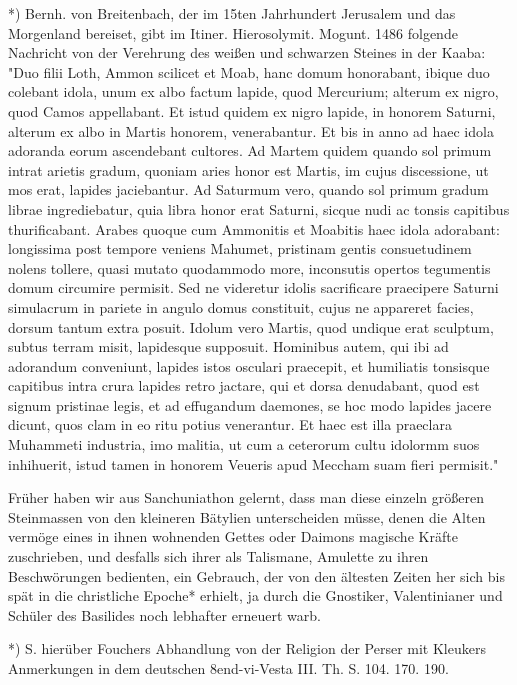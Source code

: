 \documentclass[a4paper, 11pt, oneside, polutonikogreek, german]{article}
\begin{document}
*) Bernh. von Breitenbach, der im 15ten Jahrhundert Jerusalem und das Morgenland bereiset, gibt im Itiner. Hierosolymit. Mogunt. 1486 folgende Nachricht von der Verehrung des weißen und schwarzen Steines in der Kaaba: "Duo filii Loth, Ammon scilicet et Moab, hanc domum honorabant, ibique duo colebant idola, unum ex albo factum lapide, quod Mercurium; alterum ex nigro, quod Camos appellabant. Et istud quidem ex nigro lapide, in honorem Saturni, alterum ex albo in Martis honorem, venerabantur. Et bis in anno ad haec idola adoranda eorum ascendebant cultores. Ad Martem quidem quando sol primum intrat arietis gradum, quoniam aries honor est Martis, im cujus discessione, ut mos erat, lapides jaciebantur. Ad Saturmum vero, quando sol primum gradum librae ingrediebatur, quia libra honor erat Saturni, sicque nudi ac tonsis capitibus thurificabant. Arabes quoque cum Ammonitis et Moabitis haec idola adorabant: longissima post tempore veniens Mahumet, pristinam gentis consuetudinem nolens tollere, quasi mutato quodammodo more, inconsutis opertos tegumentis domum circumire permisit. Sed ne videretur idolis sacrificare praecipere Saturni simulacrum in pariete in angulo domus constituit, cujus ne appareret facies, dorsum tantum extra posuit. Idolum vero Martis, quod undique erat sculptum, subtus terram misit, lapidesque supposuit. Hominibus autem, qui ibi ad adorandum conveniunt, lapides istos osculari praecepit, et humiliatis tonsisque capitibus intra crura lapides retro jactare, qui et dorsa denudabant, quod est signum pristinae legis, et ad effugandum daemones, se hoc modo lapides jacere dicunt, quos clam in eo ritu potius venerantur. Et haec est illa praeclara Muhammeti industria, imo malitia, ut cum a ceterorum cultu idolormm suos inhihuerit, istud tamen in honorem Veueris apud Meccham suam fieri permisit."

Früher haben wir aus Sanchuniathon gelernt, dass man diese einzeln größeren Steinmassen von den kleineren Bätylien unterscheiden müsse, denen die Alten vermöge eines in ihnen wohnenden Gettes oder Daimons magische Kräfte zuschrieben, und desfalls sich ihrer als Talismane, Amulette zu ihren Beschwörungen bedienten, ein Gebrauch, der von den ältesten Zeiten her sich bis spät in die christliche Epoche* erhielt, ja durch die Gnostiker, Valentinianer und Schüler des Basilides noch lebhafter erneuert warb.

*) S. hierüber Fouchers Abhandlung von der Religion der Perser mit Kleukers Anmerkungen in dem deutschen 8end-vi-Vesta III. Th. S. 104. 170. 190.
\end{document}
